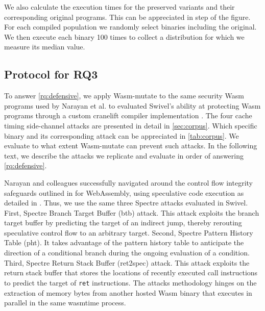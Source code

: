 \documentclass[sigplan,screen]{acmart}
\newcommand*\badge[1]{ \colorbox{red}{\color{white}#1}}
\newcommand{\tool}{Wasm-mutate\xspace}
\newcommand{\wasm}{Wasm\xspace}
\newcommand{\Wasm}{WebAssembly\xspace}
\newcommand*\step[1]{
\noindent\tikz[baseline=(char.base)]{
        \node[shape=circle,text=black,draw=black, fill=white,inner sep=1.2pt] (char) {#1};}}
\newcommand{\todo}[1]{%
\refstepcounter{todo}
\noindent\textbf{\badge{TODO}} {\color{red}#1}
\addcontentsline{td}{todo}
{\color{red}\thesection.\thetodo\xspace #1}}
\begin{document}
We also calculate the execution times for the preserved variants and their corresponding original programs.
This can be appreciated in step \step{5} of the figure.
For each compiled population we randomly select \samples binaries including the original.
We then execute each binary 100 times to collect a distribution for which we measure its median value.


\subsection{Protocol for RQ3}
\label{protocol:rq3}

\newcommand{\poct}{\emph{Cache timing POC}\xspace}
\newcommand{\pocd}{\emph{Differential computing POC}\xspace}
\newcommand{\pocp}{\emph{Port contention POC}\xspace}

To answer \ref{rq:defensive}, we apply \tool to the same security \wasm programs used by Narayan et al. to evaluated Swivel's ability at protecting \wasm programs through a custom cranelift compiler implementation \cite{Swivel}. 
The four cache timing side-channel attacks are presented in detail in \autoref{sec:corpus}. 
Which specific binary and its corresponding attack can be appreciated in \autoref{tab:corpus}.
We evaluate to what extent \tool can prevent such attacks.
In the following text, we describe the attacks we replicate and evaluate in order of answering \ref{rq:defensive}.


Narayan and colleagues successfully navigated around the control flow integrity safeguards outlined in \cite{Swivel} for \Wasm, using speculative code execution as detailed in \cite{Spectre}. 
Thus, we use the same three Spectre attacks evaluated in Swivel.
First, Spectre Branch Target Buffer (btb) attack. 
This attack exploits the branch target buffer by predicting the target of an indirect jump, thereby rerouting speculative control flow to an arbitrary target.
Second, Spectre Pattern History Table (pht).
It takes advantage of the pattern history table to anticipate the direction of a conditional branch during the ongoing evaluation of a condition. 
Third, Spectre Return Stack Buffer (ret2spec) attack. 
This attack exploits the return stack buffer that stores the locations of recently executed call instructions to predict the target of \texttt{ret} instructions. 
The attacks methodology hinges on the extraction of memory bytes from another hosted \wasm binary that executes in parallel in the same wasmtime process.
\end{document}
